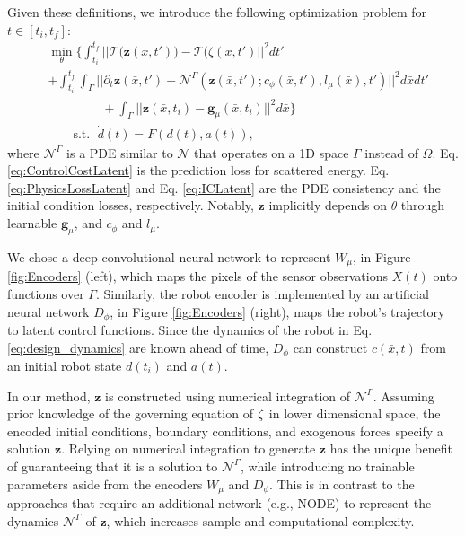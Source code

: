 Given these definitions, we introduce the following optimization problem for $t\in [t_i, t_f]$: 
\begin{align}
    &\min_{\theta}\Biggl\{ \int_{t_i}^{t_f}||\mathcal{T}\bigl(\mathbf{z}(\bar{x}, t')\bigr) - \mathcal{T}(\zeta(x, t')||^2dt'\label{eq:ControlCostLatent}\\
    &+ \int_{t_i}^{t_f}\!\!\!\!\int_\Gamma ||\partial_{t} \mathbf{z}(\bar{x}, t') - \mathcal{N}^\Gamma(\mathbf{z}(\bar{x}, t'); c_{\phi}(\bar{x}, t'), l_{\mu}(\bar{x}), t')||^2 d\bar{x}dt' \label{eq:PhysicsLossLatent}\\
    &\qquad\qquad\;+ \int_\Gamma ||\mathbf{z}(\bar{x}, t_i) - \mathbf{g}_{\mu}(\bar{x}, t_i)||^2 d\bar{x}\label{eq:ICLatent}\Biggr\}\\
    &\qquad\mbox{s.t. }\;\dot{d}(t) = F(d(t), a(t))\nonumber,
\end{align}
where $\mathcal{N}^{\Gamma}$ is a PDE similar to $\mathcal{N}$ that operates on a 1D space $\Gamma$ instead of $\Omega$. Eq. \eqref{eq:ControlCostLatent} is the prediction loss for scattered energy. Eq. \eqref{eq:PhysicsLossLatent} and Eq. \eqref{eq:ICLatent} are the PDE consistency and the initial condition losses, respectively. Notably, $\mathbf{z}$ implicitly depends on $\theta$ through learnable $\mathbf{g}_{\mu}$, and $c_{\phi}$ and $l_{\mu}$.

We chose a deep convolutional neural network to represent $W_\mu$, in Figure \ref{fig:Encoders} (left), which maps the pixels of the sensor observations $X(t)$ onto functions over $\Gamma$. Similarly, the robot encoder is implemented by an artificial neural network $D_\phi$, in Figure \ref{fig:Encoders} (right), maps the robot's trajectory to latent control functions. Since the dynamics of the robot in Eq. \eqref{eq:design_dynamics} are known ahead of time, $D_\phi$ can construct $c(\bar{x}, t)$ from an initial robot state $d(t_i)$ and $a(t)$.

In our method, $\mathbf{z}$ is constructed using numerical integration of $\mathcal{N}^{\Gamma}$. Assuming prior knowledge of the governing equation of $\zeta$ in lower dimensional space, the encoded initial conditions, boundary conditions, and exogenous forces specify a solution $\mathbf{z}$. Relying on numerical integration to generate $\mathbf{z}$ has the unique benefit of guaranteeing that it is a solution to $\mathcal{N}^{\Gamma}$, while introducing no trainable parameters aside from the encoders $W_\mu$ and $D_\phi$. This is in contrast to the approaches that require an additional network (e.g., NODE) to represent the dynamics $\mathcal{N}^{\Gamma}$ of $\mathbf{z}$, which increases sample and computational complexity.

